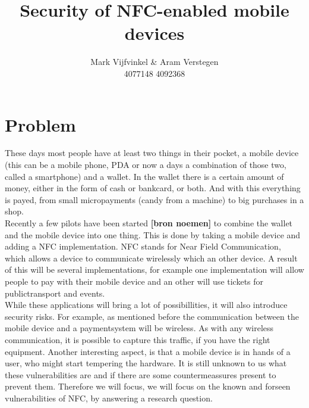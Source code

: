 \documentclass[11pt]{article} %
\title{Security of NFC-enabled mobile devices}
\author{Mark Vijfvinkel \& Aram Verstegen \\ 4077148 4092368}
\date{} %
\begin{document}
\maketitle


\section{Problem}

These days most people have at least two things in their pocket, a mobile device (this can be a mobile phone, PDA or now a days a combination of those two, called a smartphone) and a wallet. In the wallet there is a certain amount of money, either in the form of cash or bankcard, or both. And with this everything is payed, from small micropayments (candy from a machine) to big purchases in a shop.
\\ Recently a few pilots have been started \textbf { [bron noemen]} to combine the wallet and the mobile device into one thing. This is done by taking a mobile device and adding a NFC implementation. NFC stands for Near Field Communication, which allows a device to communicate wirelessly which an other device. A result of this will be several implementations, for example one implementation will allow people to pay with their mobile device and an other will use tickets for publictransport and events. 
\\ While these applications will bring a lot of possibillities, it will also introduce security risks. For example, as mentioned before the communication between the mobile device and a paymentsystem will be wireless. As with any wireless communication, it is possible to capture this traffic, if you have the right equipment. Another interesting aspect, is that a mobile device is in hands of a user, who might start tempering the hardware. It is still unknown to us what these vulnerabilities are and if there are some countermeassures present to prevent them. Therefore we will focus, we will focus on the known and forseen vulnerabilities of NFC, by answering a research question.
\end{document}
